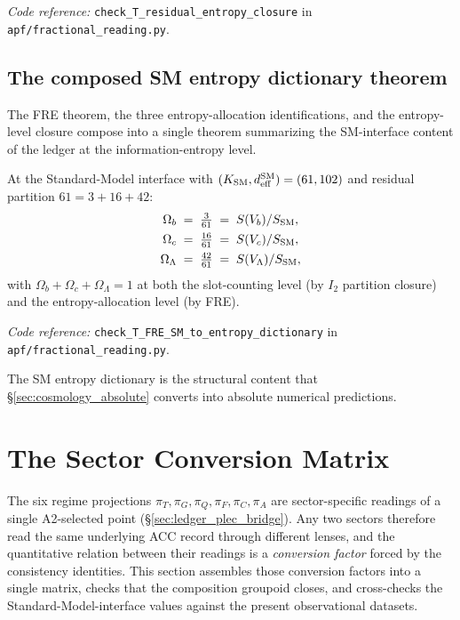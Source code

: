 \documentclass[11pt]{article}
\newcommand{\coderef}[2]{\smallskip\noindent\textit{Code reference:} \texttt{#1} in \texttt{#2}.}
\begin{document}
\coderef{check\_T\_residual\_entropy\_closure}{apf/fractional\_reading.py}

\subsection{The composed SM entropy dictionary theorem}\label{sec:FRE_dictionary}

The FRE theorem, the three entropy-allocation identifications, and the entropy-level closure compose into a single theorem summarizing the SM-interface content of the ledger at the information-entropy level.

\begin{tcolorbox}[apfbox, title={Theorem T\_FRE\_SM\_to\_entropy\_dictionary}]
At the Standard-Model interface with $(K_{\rm SM}, d_{\rm eff}^{\rm SM}) = (61, 102)$ and residual partition $61 = 3 + 16 + 42$:
\begin{align*}
\Omega_b       \;&=\; \tfrac{3}{61}  \;=\; S(V_b)/S_{\rm SM}, \\
\Omega_c       \;&=\; \tfrac{16}{61} \;=\; S(V_c)/S_{\rm SM}, \\
\Omega_\Lambda \;&=\; \tfrac{42}{61} \;=\; S(V_\Lambda)/S_{\rm SM},
\end{align*}
with $\Omega_b + \Omega_c + \Omega_\Lambda = 1$ at both the slot-counting level (by $I_2$ partition closure) and the entropy-allocation level (by FRE).
\end{tcolorbox}

\coderef{check\_T\_FRE\_SM\_to\_entropy\_dictionary}{apf/fractional\_reading.py}

\smallskip

The SM entropy dictionary is the structural content that \S\ref{sec:cosmology_absolute} converts into absolute numerical predictions.

\section{The Sector Conversion Matrix}\label{sec:conversion_matrix}

The six regime projections $\pi_T, \pi_G, \pi_Q, \pi_F, \pi_C, \pi_A$ are sector-specific readings of a single A2-selected point (\S\ref{sec:ledger_plec_bridge}). Any two sectors therefore read the same underlying ACC record through different lenses, and the quantitative relation between their readings is a \emph{conversion factor} forced by the consistency identities. This section assembles those conversion factors into a single matrix, checks that the composition groupoid closes, and cross-checks the Standard-Model-interface values against the present observational datasets.
\end{document}
